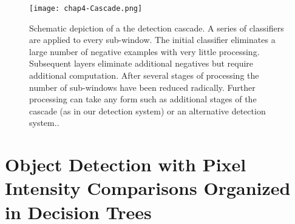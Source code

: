 \begin{compactitem}
\begin{figure}[h]
  \centering
	\texttt{[image: chap4-Cascade.png]}
  \caption{Schematic depiction of a the detection cascade. A series of classifiers are applied
to every sub-window. The initial classifier eliminates a large number of negative
examples with very little processing. Subsequent layers eliminate additional negatives
but require additional computation. After several stages of processing the number of
sub-windows have been reduced radically. Further processing can take any form such
as additional stages of the cascade (as in our detection system) or an alternative detection
system..}
  \label{fig:chap4-Cascade}
\end{figure}

\end{compactitem}

\section{Object Detection with Pixel Intensity Comparisons Organized in Decision Trees}
\cite{DBLPjournalscorrabs}

